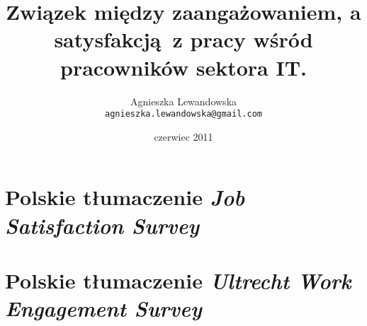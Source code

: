 \documentclass[a4paper,11pt,titlepage]{article}
\begin{document}
\title{Związek między zaangażowaniem, a satysfakcją~z pracy wśród pracowników sektora IT.}
\author{\Large{Agnieszka Lewandowska} \\ \texttt{agnieszka.lewandowska@gmail.com} }
\date{czerwiec 2011}
\maketitle


\tableofcontents
\cleardoublepage







\graphicspath{{img/group/}}


\graphicspath{{img/results/}}


\cleardoublepage
\appendix
\section{Polskie tłumaczenie \emph{Job Satisfaction Survey}}
\section{Polskie tłumaczenie \emph{Ultrecht Work Engagement Survey}}
\end{document}
